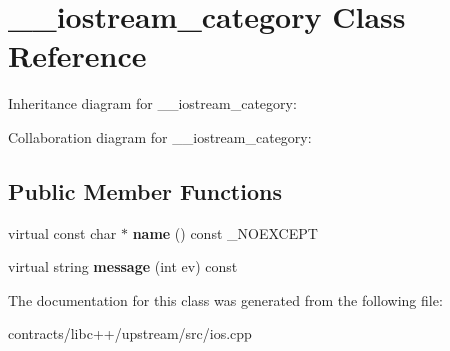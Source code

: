 \hypertarget{class____iostream__category}{}\section{\+\_\+\+\_\+iostream\+\_\+category Class Reference}
\label{class____iostream__category}


Inheritance diagram for \+\_\+\+\_\+iostream\+\_\+category\+:


Collaboration diagram for \+\_\+\+\_\+iostream\+\_\+category\+:
\subsection*{Public Member Functions}
\begin{DoxyCompactItemize}
\item 
\mbox{\label{class____iostream__category_a978672bce929dcf9c719a3e35ba69424}} 
virtual const char $\ast$ {\bfseries name} () const \+\_\+\+N\+O\+E\+X\+C\+E\+PT
\item 
\mbox{\label{class____iostream__category_acbbf9705bde0ab3c76acb9f9c7519771}} 
virtual string {\bfseries message} (int ev) const
\end{DoxyCompactItemize}


The documentation for this class was generated from the following file\+:\begin{DoxyCompactItemize}
\item 
contracts/libc++/upstream/src/ios.\+cpp\end{DoxyCompactItemize}
